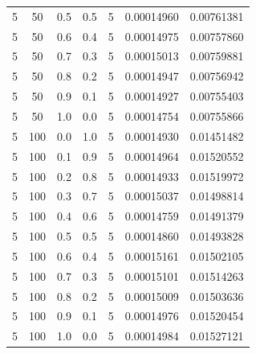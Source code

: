 \documentclass[12pt, a4paper]{report}
\begin{document}
\begin{table} [H]
\begin{tabular}[l]{|c c c c c c c|}
			5 & 50 & 0.5 & 0.5 & 5 & 0.00014960 & 0.00761381 \\
			
			5 & 50 & 0.6 & 0.4 & 5 & 0.00014975 & 0.00757860 \\
			
			5 & 50 & 0.7 & 0.3 & 5 & 0.00015013 & 0.00759881 \\
			
			5 & 50 & 0.8 & 0.2 & 5 & 0.00014947 & 0.00756942 \\
			
			5 & 50 & 0.9 & 0.1 & 5 & 0.00014927 & 0.00755403 \\
			
			5 & 50 & 1.0 & 0.0 & 5 & 0.00014754 & 0.00755866 \\
			
			5 & 100 & 0.0 & 1.0 & 5 & 0.00014930 & 0.01451482 \\
			
			5 & 100 & 0.1 & 0.9 & 5 & 0.00014964 & 0.01520552 \\
			
			5 & 100 & 0.2 & 0.8 & 5 & 0.00014933 & 0.01519972 \\
			
			5 & 100 & 0.3 & 0.7 & 5 & 0.00015037 & 0.01498814 \\
			
			5 & 100 & 0.4 & 0.6 & 5 & 0.00014759 & 0.01491379 \\
			
			5 & 100 & 0.5 & 0.5 & 5 & 0.00014860 & 0.01493828 \\
			
			5 & 100 & 0.6 & 0.4 & 5 & 0.00015161 & 0.01502105 \\
			
			5 & 100 & 0.7 & 0.3 & 5 & 0.00015101 & 0.01514263 \\
			
			5 & 100 & 0.8 & 0.2 & 5 & 0.00015009 & 0.01503636 \\
			
			5 & 100 & 0.9 & 0.1 & 5 & 0.00014976 & 0.01520454 \\
			
			5 & 100 & 1.0 & 0.0 & 5 & 0.00014984 & 0.01527121 \\\hline
		\end{tabular}
	\end{table}
	
\end{document}
